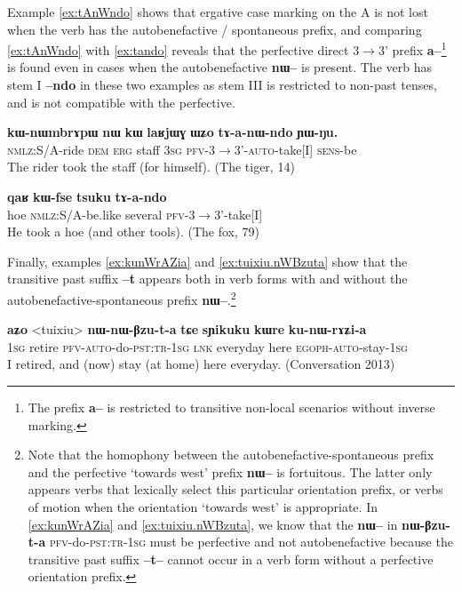 \documentclass[oldfontcommands,oneside,a4paper,11pt]{article}
\newcommand{\ipa}[1]{\textbf{{\phon\mbox{#1}}}} %
\begin{document}
Example \ref{ex:tAnWndo} shows that ergative case marking on the A is not lost when the verb has the autobenefactive / spontaneous prefix, and comparing \ref{ex:tAnWndo} with  \ref{ex:tando} reveals that the perfective direct 3$\rightarrow$3' prefix \ipa{a--}\footnote{The  prefix \ipa{a--} is restricted to transitive non-local scenarios without inverse marking.  } is found even in cases when the autobenefactive \ipa{nɯ--} is present. The verb has stem I \ipa{--ndo} in these two examples as stem III is restricted to non-past tenses, and is not compatible with the perfective.

 \begin{exe}
\ex \label{ex:tAnWndo}
\gll
\ipa{kɯ-nɯmbrɤpɯ} 	\ipa{nɯ} 	\ipa{kɯ} 	\ipa{laʁjɯɣ} 	\ipa{ɯʑo} 	\ipa{tɤ-a-nɯ-ndo} 	\ipa{ɲɯ-ŋu.}\\
\textsc{nmlz}:S/A-ride \textsc{dem} \textsc{erg} staff \textsc{3sg} \textsc{pfv}-3$\rightarrow$3'-\textsc{auto}-take[I]  \textsc{sens}-be\\ 
\glt The rider took the staff (for himself). (The tiger, 14) 
\end{exe}

 \begin{exe}
\ex \label{ex:tando}
\gll 
\ipa{qaʁ} 	\ipa{kɯ-fse} 	\ipa{tsuku} 	\ipa{tɤ-a-ndo}  \\
hoe  \textsc{nmlz}:S/A-be.like several \textsc{pfv}-3$\rightarrow$3'-take[I]  \\ 
 \glt He took a hoe (and other tools). (The fox, 79)
\end{exe} 

Finally, examples \ref{ex:kunWrAZia} and \ref{ex:tuixiu.nWBzuta} show that the transitive past suffix \ipa{--t}   appears both in verb forms with and without the autobenefactive-spontaneous prefix \ipa{nɯ--}.\footnote{Note that the homophony between the autobenefactive-spontaneous prefix and the perfective `towards west' prefix \ipa{nɯ--} is fortuitous. The latter only appears verbs that lexically select this particular orientation prefix, or verbs of motion when the orientation `towards west' is appropriate. In \ref{ex:kunWrAZia} and \ref{ex:tuixiu.nWBzuta}, we know that the  \ipa{nɯ--} in \ipa{nɯ-βzu-t-a} \textsc{pfv}-do-\textsc{pst:tr-1sg} must be perfective and not autobenefactive because the transitive past suffix \ipa{--t--} cannot occur in a verb form without a perfective orientation prefix.}

 \begin{exe}
\ex \label{ex:kunWrAZia}
\gll 
\ipa{aʑo} 	<tuixiu> 	\ipa{nɯ-nɯ-βzu-t-a} 	\ipa{tɕe} 	\ipa{sɲikuku} 	\ipa{kɯre} 	\ipa{ku-nɯ-rɤʑi-a} \\
\textsc{1sg} retire \textsc{pfv-auto}-do-\textsc{pst:tr-1sg} \textsc{lnk} everyday here \textsc{egoph-auto}-stay-\textsc{1sg} \\
\glt I retired, and (now) stay (at home) here everyday. (Conversation 2013)
\end{exe} 
\end{document}
